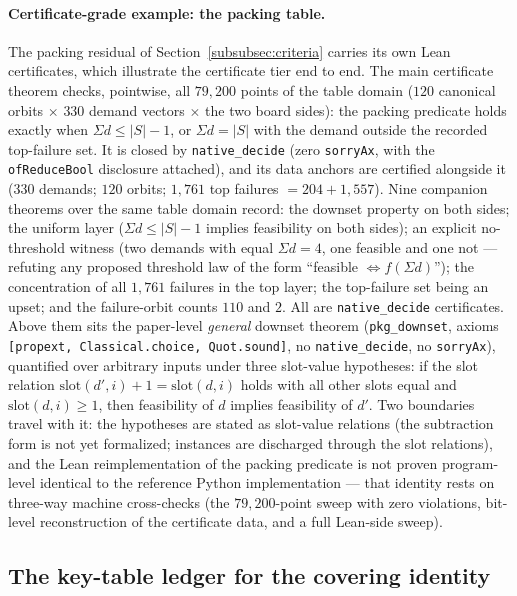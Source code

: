 \paragraph{Certificate-grade example: the packing table.} The packing
residual of Section~\ref{subsubsec:criteria} carries its own Lean
certificates, which illustrate the certificate tier end to end. The main
certificate theorem checks, pointwise, all $79{,}200$ points of the table
domain ($120$ canonical orbits $\times$ $330$ demand vectors $\times$ the
two board sides): the packing predicate holds exactly when $\Sigma
d\le|S|-1$, or $\Sigma d=|S|$ with the demand outside the recorded
top-failure set. It is closed by \texttt{native\_decide} (zero
\texttt{sorryAx}, with the \texttt{ofReduceBool} disclosure attached), and
its data anchors are certified alongside it ($330$ demands; $120$ orbits;
$1{,}761$ top failures $=204+1{,}557$). Nine companion theorems over the
same table domain record: the downset property on both sides; the uniform
layer ($\Sigma d\le|S|-1$ implies feasibility on both sides); an explicit
no-threshold witness (two demands with equal $\Sigma d=4$, one feasible and
one not --- refuting any proposed threshold law of the form ``feasible
$\iff f(\Sigma d)$''); the concentration of all $1{,}761$ failures in the
top layer; the top-failure set being an upset; and the failure-orbit counts
$110$ and $2$. All are \texttt{native\_decide} certificates. Above them
sits the paper-level \emph{general} downset theorem
(\texttt{pkg\_downset}, axioms \texttt{[propext, Classical.choice,
Quot.sound]}, no \texttt{native\_decide}, no \texttt{sorryAx}), quantified
over arbitrary inputs under three slot-value hypotheses: if the slot
relation $\mathrm{slot}(d',i)+1=\mathrm{slot}(d,i)$ holds with all other
slots equal and $\mathrm{slot}(d,i)\ge1$, then feasibility of $d$ implies
feasibility of $d'$. Two boundaries travel with it: the hypotheses are
stated as slot-value relations (the subtraction form is not yet
formalized; instances are discharged through the slot relations), and the
Lean reimplementation of the packing predicate is not proven
program-level identical to the reference Python implementation --- that
identity rests on three-way machine cross-checks (the $79{,}200$-point
sweep with zero violations, bit-level reconstruction of the certificate
data, and a full Lean-side sweep).

\subsection{The key-table ledger for the covering identity}\label{com:subsec-ledger}

